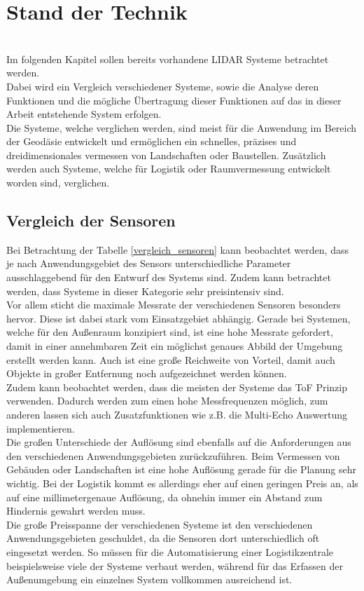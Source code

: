 \chapter{Stand der Technik}\label{chap:stand_der_technik}
\\
Im folgenden Kapitel sollen bereits vorhandene \ac{LIDAR} Systeme betrachtet werden.\\
Dabei wird ein Vergleich verschiedener Systeme, sowie die Analyse deren Funktionen und die mögliche Übertragung dieser Funktionen auf das in dieser Arbeit entstehende System erfolgen.\\
Die Systeme, welche verglichen werden, sind meist für die Anwendung im Bereich der Geodäsie entwickelt und ermöglichen ein schnelles, präzises und dreidimensionales vermessen von Landschaften oder Baustellen. Zusätzlich werden auch Systeme, welche für Logistik oder Raumvermessung entwickelt worden sind, verglichen. \\

\section{Vergleich der Sensoren}
Bei Betrachtung der Tabelle \ref{vergleich_sensoren} kann beobachtet werden, dass je nach Anwendungsgebiet des Sensors unterschiedliche Parameter ausschlaggebend für den Entwurf des Systems sind. Zudem kann betrachtet werden, dass Systeme in dieser Kategorie sehr preisintensiv sind. \\
Vor allem sticht die maximale Messrate der verschiedenen Sensoren besonders hervor. Diese ist dabei stark vom Einsatzgebiet abhängig. Gerade bei Systemen, welche für den Außenraum konzipiert sind, ist eine hohe Messrate gefordert, damit in einer annehmbaren Zeit ein möglichst genaues Abbild der Umgebung erstellt werden kann. Auch ist eine große Reichweite von Vorteil, damit auch Objekte in großer Entfernung noch aufgezeichnet werden können. \\
Zudem kann beobachtet werden, dass die meisten der Systeme das \ac{ToF} Prinzip verwenden. Dadurch werden zum einen hohe Messfrequenzen möglich, zum anderen lassen sich auch Zusatzfunktionen wie z.B. die Multi-Echo Auswertung implementieren. \\
Die großen Unterschiede der Auflösung sind ebenfalls auf die Anforderungen aus den verschiedenen Anwendungsgebieten zurückzuführen. Beim Vermessen von Gebäuden oder Landschaften ist eine hohe Auflösung gerade für die Planung sehr wichtig. Bei der Logistik kommt es allerdings eher auf einen geringen Preis an, als auf eine millimetergenaue Auflösung, da ohnehin immer ein Abstand zum Hindernis gewahrt werden muss.\\
Die große Preisspanne der verschiedenen Systeme ist den verschiedenen Anwendungsgebieten geschuldet, da die Sensoren dort unterschiedlich oft eingesetzt werden. So müssen für die Automatisierung einer Logistikzentrale beispielsweise viele der Systeme verbaut werden, während für das Erfassen der Außenumgebung ein einzelnes System vollkommen ausreichend ist.

